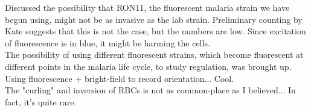 \documentclass{article}
\begin{document}
Discussed the possibility that RON11, the fluorescent malaria strain we have begun using, might not be as invasive as the lab strain. Preliminary counting by Kate suggests that this is not the case, but the numbers are low. Since excitation of fluorescence is in blue, it might be harming the cells.\\

The possibility of using different fluorescent strains, which become fluorescent at different points in the malaria life cycle, to study regulation, was brought up.\\

Using fluorescence + bright-field to record orientation... Cool.\\

The "curling" and inversion of RBCs is not as common-place as I believed... In fact, it's quite rare.\\


{}

\end{document}
